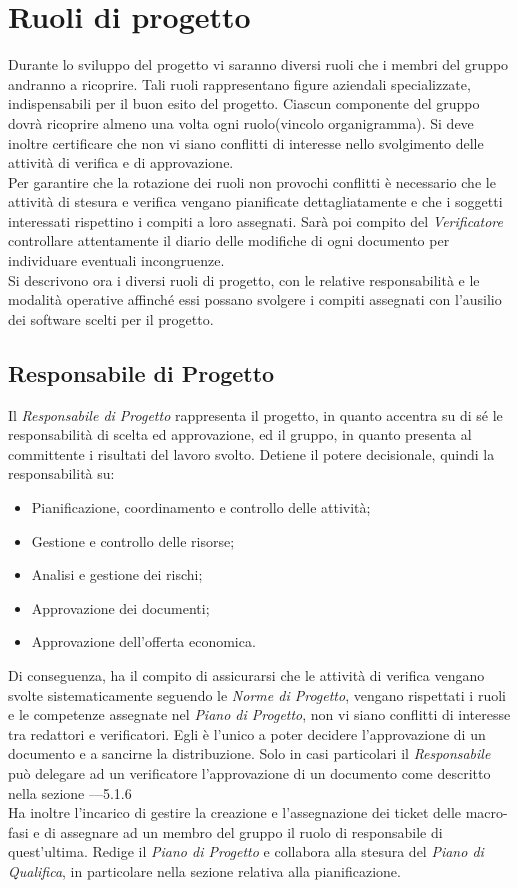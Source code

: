 \section{Ruoli di progetto}
Durante lo sviluppo del progetto vi saranno diversi ruoli che i membri del gruppo andranno a ricoprire. Tali ruoli rappresentano figure aziendali specializzate, indispensabili per il buon esito del progetto. Ciascun componente del gruppo dovrà ricoprire almeno una volta ogni ruolo(vincolo organigramma). Si deve inoltre certificare che non vi siano conflitti di interesse nello svolgimento delle attività di verifica e di approvazione.\\
Per garantire che la rotazione dei ruoli non provochi conflitti è necessario che le attività di stesura e verifica vengano pianificate dettagliatamente e che i soggetti interessati rispettino i compiti a loro assegnati. Sarà poi compito del \textit{Verificatore} controllare attentamente il diario delle modifiche di ogni documento per individuare eventuali incongruenze.\\
Si descrivono ora i diversi ruoli di progetto, con le relative responsabilità e le modalità operative affinché essi possano svolgere i compiti assegnati con l'ausilio dei software scelti per il progetto.
\subsection{Responsabile di Progetto}
Il \textit{Responsabile di Progetto} rappresenta il progetto, in quanto accentra su di sé le responsabilità di scelta ed approvazione, ed il gruppo, in quanto presenta al committente i risultati del lavoro svolto.
Detiene il potere decisionale, quindi la responsabilità su:
\begin{itemize}
\item Pianificazione, coordinamento e controllo delle attività;
\item Gestione e controllo delle risorse;
\item Analisi e gestione dei rischi;
\item Approvazione dei documenti;
\item Approvazione dell'offerta economica.
\end{itemize}
Di conseguenza, ha il compito di assicurarsi che le attività di verifica vengano svolte sistematicamente seguendo le \textit{Norme di Progetto}, vengano rispettati i ruoli e le competenze assegnate nel \textit{Piano di Progetto}, non vi siano conflitti di interesse tra redattori e verificatori. Egli è l'unico a poter decidere l'approvazione di un documento e a sancirne
la distribuzione. Solo in casi particolari il \textit{Responsabile} può delegare ad un verificatore l'approvazione di un documento come descritto nella sezione ---5.1.6 \\
Ha inoltre l'incarico di gestire la creazione e l'assegnazione dei ticket delle macro-fasi e di assegnare ad un membro del gruppo il ruolo di responsabile di quest’ultima.
Redige il \textit{Piano di Progetto} e collabora alla stesura del \textit{Piano di Qualifica}, in particolare nella sezione relativa alla pianificazione.

